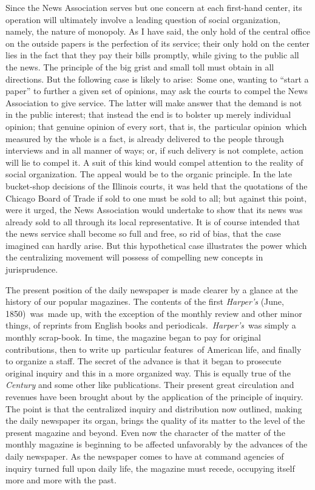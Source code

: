 \documentclass[openany,nobib]{tufte-book}
\begin{document}
Since the News Association serves but one concern at each first-hand
center, its operation will ultimately involve a leading question of
social organization, namely, the nature of monopoly. As I have said, the
only hold of the central office on the outside papers is the perfection
of its service; their only hold on the center lies in the fact that they
pay their bills promptly, while giving to the public all the news. The
principle of the big grist and small toll must obtain in all directions.
But the following case is likely to arise:~Some one, wanting to ``start
a paper'' to further a given set of opinions, may ask the courts to
compel the News Association to give service. The latter will make answer
that the demand is not in the public interest; that instead the end is
to bolster up merely individual opinion; that genuine opinion of every
sort, that is, the~particular opinion~which measured by the whole is a
fact, is already delivered to the people through interviews and in all
manner of ways; or, if such delivery is not complete, action will lie to
compel it. A suit of this kind would compel attention to the reality of
social organization. The appeal would be to the organic principle. In
the late bucket-shop decisions of the Illinois courts, it was held that
the quotations of the Chicago Board of Trade if sold to one must be sold
to all; but against this point, were it urged, the News Association
would undertake to show that its news was already sold to all through
its local representative. It is of course intended that the news service
shall become so full and free, so rid of bias, that the case imagined
can hardly arise. But this hypothetical case illustrates the power which
the centralizing movement will possess of compelling new concepts in
jurisprudence.~

The present position of the daily newspaper is made clearer by a glance
at the history of our popular magazines. The contents of the first
\emph{Harper's} (June, 1850)~was~made up, with the exception of the
monthly review and other minor things, of reprints from English books
and periodicals.~\emph{Harper's}~was simply a monthly scrap-book. In
time, the magazine began to pay for original contributions, then to
write up~particular features~of American life, and finally to organize a
staff. The secret of the advance is that it began to prosecute original
inquiry and this in a more organized way. This is equally true of the
\emph{Century} and some other like publications. Their present great
circulation and revenues have been brought about by the application of
the principle of inquiry. The point is that the centralized inquiry and
distribution now outlined, making the daily newspaper its organ, brings
the quality of its matter to the level of the present magazine and
beyond. Even now the character of the matter of the monthly magazine is
beginning to be affected unfavorably by the advances of the daily
newspaper. As the newspaper comes to have at command agencies of inquiry
turned full upon daily life, the magazine must recede, occupying itself
more and more with the past.~
\end{document}

